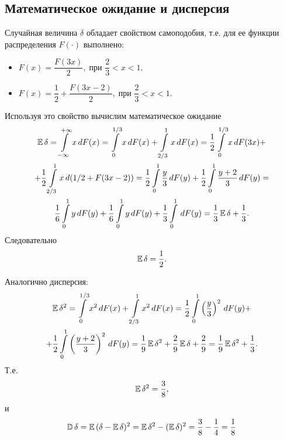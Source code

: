     \subsection{Математическое ожидание и дисперсия}
        Случайная величина $\delta$ обладает свойством самоподобия, т.е. для ее 
        функции распределения $F(\cdot)$ выполнено: 
        \begin{itemize}
            \item $F(x) = \dfrac{F(3x)}{2},\; \text{при } \dfrac{2}{3} < x < 1,$
            \item $F(x) = \dfrac{1}{2} + \dfrac{F(3x-2)}{2},\; \text{при } \dfrac{2}{3} < x < 1.$
        \end{itemize}
        Используя это свойство вычислим математическое ожидание
        \begin{multline*}
        \operatorname{\mathbb{E}}{\delta} = \int\limits_{-\infty}^{+\infty} x \,dF(x) = 
            \int\limits_{0}^{1/3} x \,dF(x) + \int\limits_{2/3}^{1} x \,dF(x) =
            \dfrac{1}{2}\int\limits_{0}^{1/3} x \,dF(3x) + \\
        + \dfrac{1}{2}\int\limits_{2/3}^{1} x \,d(1/2+F(3x-2)) = 
            \dfrac{1}{2}\int\limits_{0}^{1} \dfrac{y}{3} \,dF(y) + 
            \dfrac{1}{2}\int\limits_{0}^{1} \dfrac{y+2}{3} \,dF(y) = \\
        \dfrac{1}{6}\int\limits_{0}^{1} y \,dF(y) + 
            \dfrac{1}{6}\int\limits_{0}^{1} y \,dF(y) + 
            \dfrac{1}{3}\int\limits_{0}^{1} \,dF(y) = 
        \dfrac{1}{3}\operatorname{\mathbb{E}}{\delta} + \dfrac{1}{3}.
        \end{multline*}
        Следовательно 
        \[ \operatorname{\mathbb{E}}{\delta} = \frac{1}{2}. \]

        Аналогично дисперсия:
        \begin{multline*}
        \operatorname{\mathbb{E}}{\delta^2} = \int\limits_{0}^{1/3} x^2 \,dF(x) + 
            \int\limits_{2/3}^{1} x^2 \,dF(x) = 
                \dfrac{1}{2}\int\limits_{0}^{1} \left(\dfrac{y}{3}\right)^2 \,dF(y) + \\
            + \dfrac{1}{2}\int\limits_{0}^{1} \left(\dfrac{y+2}{3}\right)^2 \,dF(y) = 
                \dfrac{1}{9}\operatorname{\mathbb{E}}{\delta^2} + \dfrac{2}{9}\operatorname{\mathbb{E}}{\delta} + \dfrac{2}{9} = 
                \dfrac{1}{9}\operatorname{\mathbb{E}}{\delta^2} + \dfrac{1}{3}.
        \end{multline*}
        Т.е.
        \[\operatorname{\mathbb{E}}{\delta^2} = \dfrac{3}{8},\]
        и
        \[\operatorname{\mathbb{D}}{\delta} = \operatorname{\mathbb{E}}{(\delta - \operatorname{\mathbb{E}}{\delta})^2} = 
        \operatorname{\mathbb{E}}{\delta^2} - (\operatorname{\mathbb{E}}{\delta})^2 = \dfrac{3}{8} - \dfrac{1}{4} = \frac{1}{8}\]
        
